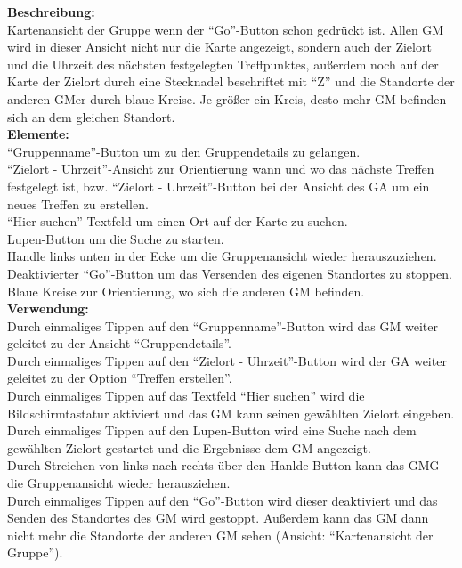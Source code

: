 \textbf{Beschreibung:}\\
Kartenansicht der Gruppe wenn der "`Go"'-Button schon gedrückt ist. Allen GM wird in dieser Ansicht nicht nur die Karte angezeigt, sondern auch der Zielort und die Uhrzeit des nächsten festgelegten Treffpunktes, außerdem noch auf der Karte der Zielort durch eine Stecknadel beschriftet mit "`Z"' und die Standorte der anderen GMer durch blaue Kreise. Je größer ein Kreis, desto mehr GM befinden sich an dem gleichen Standort.\\
\textbf{Elemente:}\\
"`Gruppenname"'-Button um zu den Gruppendetails zu gelangen.\\
"`Zielort - Uhrzeit"'-Ansicht zur Orientierung wann und wo das nächste Treffen festgelegt ist, bzw. "`Zielort - Uhrzeit"'-Button bei der Ansicht des GA um ein neues Treffen zu erstellen.\\
"`Hier suchen"'-Textfeld um einen Ort auf der Karte zu suchen.\\
Lupen-Button um die Suche zu starten.\\
Handle links unten in der Ecke um die Gruppenansicht wieder herauszuziehen.\\
Deaktivierter "`Go"'-Button um das Versenden des eigenen Standortes zu stoppen.\\
Blaue Kreise zur Orientierung, wo sich die anderen GM befinden.\\
\textbf{Verwendung:}\\
Durch einmaliges Tippen auf den "`Gruppenname"'-Button wird das GM weiter geleitet zu der Ansicht "`Gruppendetails"'.\\
Durch einmaliges Tippen auf den "`Zielort - Uhrzeit"'-Button wird der GA weiter geleitet zu der Option "`Treffen erstellen"'.\\
Durch einmaliges Tippen auf das Textfeld "`Hier suchen"' wird die Bildschirmtastatur aktiviert und das GM kann seinen gewählten Zielort eingeben.\\
Durch einmaliges Tippen auf den Lupen-Button wird eine Suche nach dem gewählten Zielort gestartet und die Ergebnisse dem GM angezeigt.\\
Durch Streichen von links nach rechts über den Hanlde-Button kann das GMG die Gruppenansicht wieder herausziehen.\\
Durch einmaliges Tippen auf den "`Go"'-Button wird dieser deaktiviert und das Senden des Standortes des GM wird gestoppt. Außerdem kann das GM dann nicht mehr die Standorte der anderen GM sehen (Ansicht: "`Kartenansicht der Gruppe"').
\clearpage
\newpage


